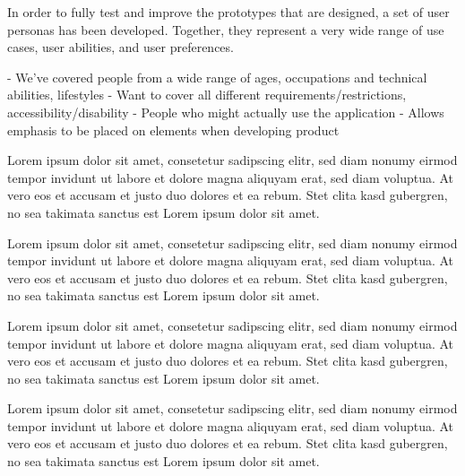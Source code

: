 In order to fully test and improve the prototypes that are designed, a set of
user personas has been developed. Together, they represent a very wide range of
use cases, user abilities, and user preferences.

- We've covered people from a wide range of ages, occupations and technical abilities, lifestyles
- Want to cover all different requirements/restrictions, accessibility/disability
- People who might actually use the application
- Allows emphasis to be placed on elements when developing product

Lorem ipsum dolor sit amet, consetetur sadipscing elitr, sed diam nonumy eirmod
tempor invidunt ut labore et dolore magna aliquyam erat, sed diam voluptua. At
vero eos et accusam et justo duo dolores et ea rebum. Stet clita kasd gubergren,
no sea takimata sanctus est Lorem ipsum dolor sit amet.

Lorem ipsum dolor sit amet, consetetur sadipscing elitr, sed diam nonumy eirmod
tempor invidunt ut labore et dolore magna aliquyam erat, sed diam voluptua. At
vero eos et accusam et justo duo dolores et ea rebum. Stet clita kasd gubergren,
no sea takimata sanctus est Lorem ipsum dolor sit amet.

Lorem ipsum dolor sit amet, consetetur sadipscing elitr, sed diam nonumy eirmod
tempor invidunt ut labore et dolore magna aliquyam erat, sed diam voluptua. At
vero eos et accusam et justo duo dolores et ea rebum. Stet clita kasd gubergren,
no sea takimata sanctus est Lorem ipsum dolor sit amet.

Lorem ipsum dolor sit amet, consetetur sadipscing elitr, sed diam nonumy eirmod
tempor invidunt ut labore et dolore magna aliquyam erat, sed diam voluptua. At
vero eos et accusam et justo duo dolores et ea rebum. Stet clita kasd gubergren,
no sea takimata sanctus est Lorem ipsum dolor sit amet.


